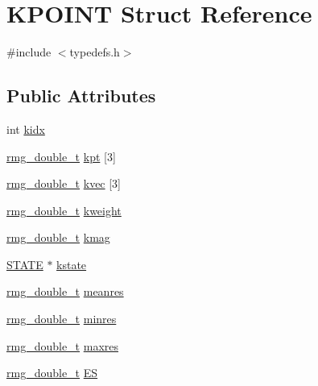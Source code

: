 \hypertarget{struct_k_p_o_i_n_t}{\section{K\-P\-O\-I\-N\-T Struct Reference}
\label{struct_k_p_o_i_n_t}
}


{\ttfamily \#include $<$typedefs.\-h$>$}

\subsection*{Public Attributes}
\begin{DoxyCompactItemize}
\item 
int \hyperlink{struct_k_p_o_i_n_t_a96b3442328529ba292f03166eefa6d2e}{kidx}
\item 
\hyperlink{rmgtypes_8h_aaa16921c14f121c56eaa42390a340db8}{rmg\-\_\-double\-\_\-t} \hyperlink{struct_k_p_o_i_n_t_a1790f499bd0e9874a35d94557aa88f29}{kpt} \mbox{[}3\mbox{]}
\item 
\hyperlink{rmgtypes_8h_aaa16921c14f121c56eaa42390a340db8}{rmg\-\_\-double\-\_\-t} \hyperlink{struct_k_p_o_i_n_t_a8cc251866b1a5a09d6214a617fa18589}{kvec} \mbox{[}3\mbox{]}
\item 
\hyperlink{rmgtypes_8h_aaa16921c14f121c56eaa42390a340db8}{rmg\-\_\-double\-\_\-t} \hyperlink{struct_k_p_o_i_n_t_a115049f8975606cf00d3a5ee43172368}{kweight}
\item 
\hyperlink{rmgtypes_8h_aaa16921c14f121c56eaa42390a340db8}{rmg\-\_\-double\-\_\-t} \hyperlink{struct_k_p_o_i_n_t_a34c41cf43005cd912d4c8a64fd624e0a}{kmag}
\item 
\hyperlink{struct_s_t_a_t_e}{S\-T\-A\-T\-E} $\ast$ \hyperlink{struct_k_p_o_i_n_t_aa365ce9354e11404f9fa35a453604d54}{kstate}
\item 
\hyperlink{rmgtypes_8h_aaa16921c14f121c56eaa42390a340db8}{rmg\-\_\-double\-\_\-t} \hyperlink{struct_k_p_o_i_n_t_a90decf04605886b8ac2b7e097d2a41d0}{meanres}
\item 
\hyperlink{rmgtypes_8h_aaa16921c14f121c56eaa42390a340db8}{rmg\-\_\-double\-\_\-t} \hyperlink{struct_k_p_o_i_n_t_a750af6b939f8cb7207d6fc6d7345ca22}{minres}
\item 
\hyperlink{rmgtypes_8h_aaa16921c14f121c56eaa42390a340db8}{rmg\-\_\-double\-\_\-t} \hyperlink{struct_k_p_o_i_n_t_a916474019d93f710ca843d2946558c90}{maxres}
\item 
\hyperlink{rmgtypes_8h_aaa16921c14f121c56eaa42390a340db8}{rmg\-\_\-double\-\_\-t} \hyperlink{struct_k_p_o_i_n_t_aee2d580a1094d40df128864b57990617}{E\-S}

\end{DoxyCompactItemize}
